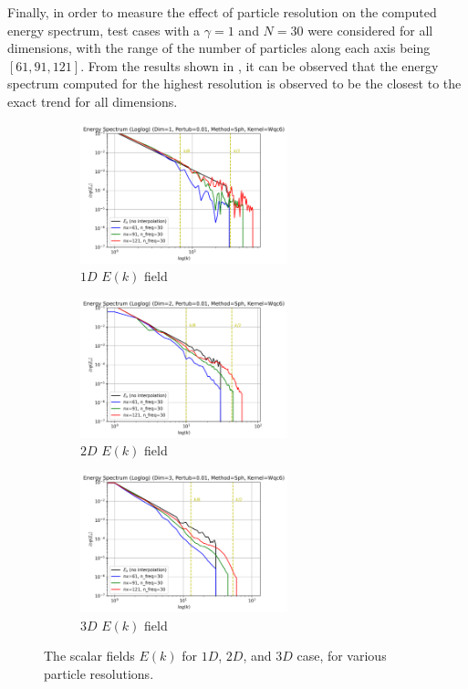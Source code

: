 Finally, in order to measure the effect of particle resolution on the computed energy spectrum, test cases with a $\gamma=1$ and $N=30$ were considered for all dimensions, with the range of the number of particles along each axis being $[61, 91, 121]$.
From the results shown in , it can be observed that the energy spectrum computed for the highest resolution is observed to be the closest to the exact trend for all dimensions.

\begin{figure}[htbp!]
	\begin{subfigure}{7cm}
		\centering\includegraphics[width=6cm]{Code-Figures/sin-vel-prof-res/Energy Spectrum (Loglog) (Dim=1, Pertub=0.01, Method=Sph, Kernel=Wqc6).png}
		\caption{$1D$ $E(k)$ field}
	\end{subfigure}
	\begin{subfigure}{7cm}
		\centering\includegraphics[width=6cm]{Code-Figures/sin-vel-prof-res/Energy Spectrum (Loglog) (Dim=2, Pertub=0.01, Method=Sph, Kernel=Wqc6).png}
		\caption{$2D$ $E(k)$ field}
	\end{subfigure}
	\begin{subfigure}{7cm}
		\centering\includegraphics[width=6cm]{Code-Figures/sin-vel-prof-res/Energy Spectrum (Loglog) (Dim=3, Pertub=0.01, Method=Sph, Kernel=Wqc6).png}
		\caption{$3D$ $E(k)$ field}
	\end{subfigure}
	\caption{The scalar fields $E(k)$ for $1D$, $2D$, and $3D$ case, for various particle resolutions.}
	\label{fig:espec-scalar-fields-res}
\end{figure}


